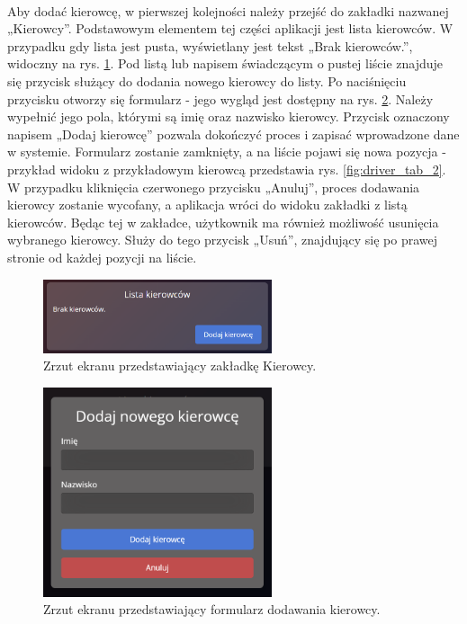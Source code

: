\paragraph{}
Aby dodać kierowcę, w pierwszej kolejności należy przejść do zakładki nazwanej „Kierowcy”. Podstawowym elementem tej części aplikacji jest lista kierowców. W przypadku gdy lista jest pusta, wyświetlany jest tekst „Brak kierowców.”, widoczny na rys. \ref{fig:driver_tab}. Pod listą lub napisem świadczącym o pustej liście znajduje się przycisk służący do dodania nowego kierowcy do listy. Po naciśnięciu przycisku otworzy się formularz - jego wygląd jest dostępny na rys. \ref{fig:add_driver}. Należy wypełnić jego pola, którymi są imię oraz nazwisko kierowcy. Przycisk oznaczony napisem „Dodaj kierowcę” pozwala dokończyć proces i zapisać wprowadzone dane w systemie. Formularz zostanie zamknięty, a na liście pojawi się nowa pozycja - przykład widoku z przykładowym kierowcą przedstawia rys. \ref{fig:driver_tab_2}. W przypadku kliknięcia czerwonego przycisku „Anuluj”, proces dodawania kierowcy zostanie wycofany, a aplikacja wróci do widoku zakładki z listą kierowców. Będąc tej w zakładce, użytkownik ma również możliwość usunięcia wybranego kierowcy. Służy do tego przycisk „Usuń”, znajdujący się po prawej stronie od każdej pozycji na liście.

\begin{figure}
	\centering
	\includegraphics[width=0.6\textwidth]{./graf/driver_tab.png}
	\caption{Zrzut ekranu przedstawiający zakładkę Kierowcy.}
	\label{fig:driver_tab}
\end{figure}

\begin{figure}
	\centering
	\includegraphics[width=0.6\textwidth]{./graf/add_driver.png}
	\caption{Zrzut ekranu przedstawiający formularz dodawania kierowcy.}
	\label{fig:add_driver}
\end{figure}


